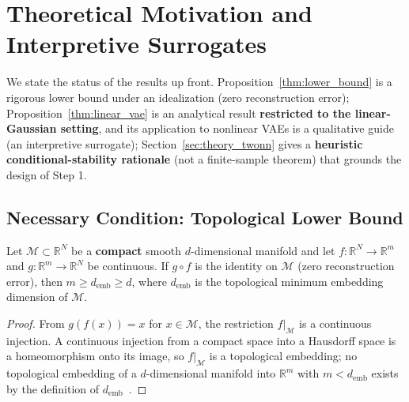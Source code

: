 \documentclass[make,article,submit,pdftex,moreauthors]{Definitions/mdpi}
\newcommand{\R}{\mathbb{R}}
\newcommand{\demb}{d_{\mathrm{emb}}}
\begin{document}
\section{Theoretical Motivation and Interpretive Surrogates}\label{sec:theory}

We state the status of the results up front.
Proposition~\ref{thm:lower_bound} is a rigorous lower bound under an
idealization (zero reconstruction error);
Proposition~\ref{thm:linear_vae} is an analytical result
\textbf{restricted to the linear-Gaussian setting}, and its application to
nonlinear VAEs is a qualitative guide (an interpretive surrogate);
Section~\ref{sec:theory_twonn} gives a \textbf{heuristic
conditional-stability rationale} (not a finite-sample theorem) that
grounds the design of Step 1.

\subsection{Necessary Condition: Topological Lower Bound}\label{sec:theory_lower}

\begin{Proposition}\label{thm:lower_bound}
Let $\mathcal{M} \subset \R^N$ be a \textbf{compact} smooth $d$-dimensional
manifold and let $f: \R^N \to \R^m$ and $g: \R^m \to \R^N$ be continuous.
If $g \circ f$ is the identity on $\mathcal{M}$ (zero reconstruction
error), then $m \geq \demb \geq d$, where $\demb$ is the topological
minimum embedding dimension of $\mathcal{M}$.
\end{Proposition}

\begin{proof}
From $g(f(x)) = x$ for $x \in \mathcal{M}$, the restriction
$f|_\mathcal{M}$ is a continuous injection.
A continuous injection from a compact space into a Hausdorff space is a
homeomorphism onto its image, so $f|_\mathcal{M}$ is a topological
embedding; no topological embedding of a $d$-dimensional manifold into
$\R^m$ with $m < \demb$ exists by the definition of
$\demb$~\cite{hatcher2002algebraic}.
\end{proof}
\end{document}

